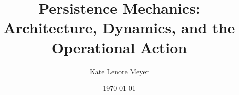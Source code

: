 \documentclass[aps,prd,twocolumn,showpacs,superscriptaddress,groupedaddress,nofootinbib,english]{revtex4-2}
\begin{document}
\title{Persistence Mechanics: Architecture, Dynamics, and the Operational Action}

\author{Kate Lenore Meyer}

\date{\today}



\maketitle %














\appendix

\end{document}
